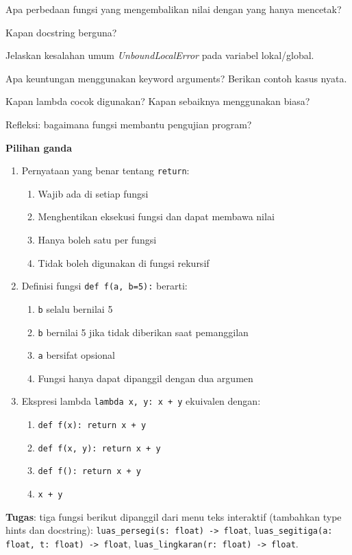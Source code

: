 ﻿\documentclass[../main.tex]{subfiles}
\begin{document}
\begin{latihan}
  \item Apa perbedaan fungsi yang mengembalikan nilai dengan yang hanya mencetak?
  \item Kapan docstring berguna?
  \item Jelaskan kesalahan umum \textit{UnboundLocalError} pada variabel lokal/global.
  \item Apa keuntungan menggunakan keyword arguments? Berikan contoh kasus nyata.
  \item Kapan lambda cocok digunakan? Kapan sebaiknya menggunakan  biasa?
  \item Refleksi: bagaimana fungsi membantu pengujian program?
\end{latihan}

\begin{asesmen}
\textbf{Pilihan ganda}

\begin{enumerate}
  \item Pernyataan yang benar tentang \texttt{return}:
  \begin{enumerate}
    \item Wajib ada di setiap fungsi
    \item Menghentikan eksekusi fungsi dan dapat membawa nilai
    \item Hanya boleh satu per fungsi
    \item Tidak boleh digunakan di fungsi rekursif
  \end{enumerate}
  \item Definisi fungsi \texttt{def f(a, b=5):} berarti:
  \begin{enumerate}
    \item \texttt{b} selalu bernilai 5
    \item \texttt{b} bernilai 5 jika tidak diberikan saat pemanggilan
    \item \texttt{a} bersifat opsional
    \item Fungsi hanya dapat dipanggil dengan dua argumen
  \end{enumerate}
  \item Ekspresi lambda \texttt{lambda x, y: x + y} ekuivalen dengan:
  \begin{enumerate}
    \item \texttt{def f(x): return x + y}
    \item \texttt{def f(x, y): return x + y}
    \item \texttt{def f(): return x + y}
    \item \texttt{x + y}
  \end{enumerate}
\end{enumerate}

\textbf{Tugas}: tiga fungsi berikut dipanggil dari menu teks interaktif (tambahkan type hints dan docstring):\newline
\texttt{luas\_persegi(s: float) -> float},\newline
\texttt{luas\_segitiga(a: float, t: float) -> float},\newline
\texttt{luas\_lingkaran(r: float) -> float}.
\end{asesmen}
\end{document}
